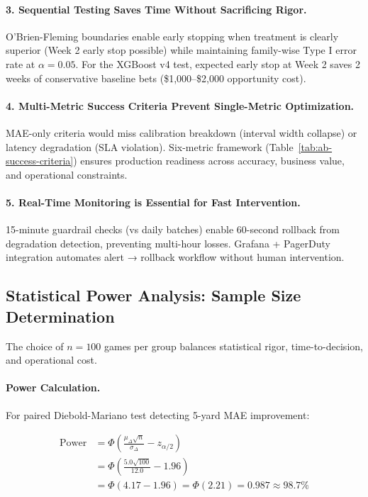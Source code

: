 \paragraph{3. Sequential Testing Saves Time Without Sacrificing Rigor.}
O'Brien-Fleming boundaries enable early stopping when treatment is clearly superior (Week 2 early stop possible) while maintaining family-wise Type I error rate at $\alpha = 0.05$. For the XGBoost v4 test, expected early stop at Week 2 saves 2 weeks of conservative baseline bets (\$1,000--\$2,000 opportunity cost).

\paragraph{4. Multi-Metric Success Criteria Prevent Single-Metric Optimization.}
MAE-only criteria would miss calibration breakdown (interval width collapse) or latency degradation (SLA violation). Six-metric framework (Table~\ref{tab:ab-success-criteria}) ensures production readiness across accuracy, business value, and operational constraints.

\paragraph{5. Real-Time Monitoring is Essential for Fast Intervention.}
15-minute guardrail checks (vs daily batches) enable 60-second rollback from degradation detection, preventing multi-hour losses. Grafana + PagerDuty integration automates alert → rollback workflow without human intervention.

\subsection{Statistical Power Analysis: Sample Size Determination}

The choice of $n = 100$ games per group balances statistical rigor, time-to-decision, and operational cost.

\paragraph{Power Calculation.}
For paired Diebold-Mariano test detecting 5-yard MAE improvement:

\begin{equation}
\begin{aligned}
\text{Power} &= \Phi \left( \frac{\mu_{\Delta} \sqrt{n}}{\sigma_{\Delta}} - z_{\alpha/2} \right) \\
&= \Phi \left( \frac{5.0 \sqrt{100}}{12.0} - 1.96 \right) \\
&= \Phi(4.17 - 1.96) = \Phi(2.21) = 0.987 \approx 98.7\%
\end{aligned}
\label{eq:power-calculation}
\end{equation}

